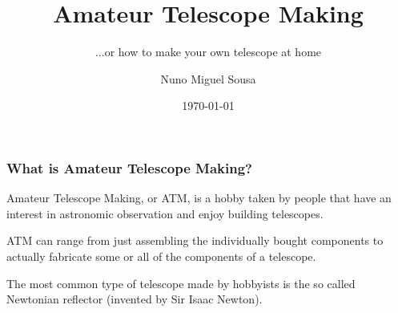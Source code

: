 \documentclass{beamer}
\title{Amateur Telescope Making}
\subtitle{...or how to make your own telescope at home}
\author{Nuno Miguel Sousa}
\institute{Coimbra, Portugal}
\date{\today}
\begin{document}
\begin{frame}
\titlepage
\end{frame}

\begin{frame}
\frametitle{What is Amateur Telescope Making?}
\begin{block}{}
Amateur Telescope Making, or ATM, is a hobby taken by people that have an interest in astronomic observation and enjoy building telescopes.\footnotemark
\end{block}
\begin{block}{}
ATM can range from just assembling the individually bought components to actually fabricate some or all of the components of a telescope.
\end{block}
\begin{block}{}
The most common type of telescope made by hobbyists is the so called Newtonian reflector (invented by Sir Isaac Newton).\footnotemark
\end{block}
\end{frame}
\end{document}
